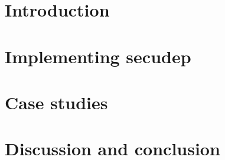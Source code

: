 \documentclass[a4paper,12pt,titlepage]{dithesis}
\begin{document}

\chapter{Introduction}
\sivunumerot{}

\chapter{Implementing secudep}

\chapter{Case studies}

\chapter{Discussion and conclusion}




\end{document}
